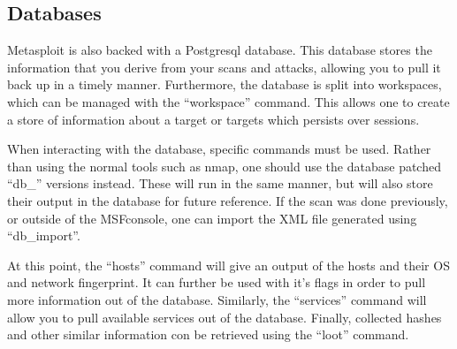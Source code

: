 \documentclass[a4paper,11pt]{report}
\begin{document}
			\subsection{Databases}
				Metasploit is also backed with a Postgresql database. 
				This database stores the information that you derive from your scans and attacks, allowing you to pull it back up in a timely manner. 
				Furthermore, the database is split into workspaces, which can be managed with the ``workspace'' command. 
				This allows one to create a store of information about a target or targets which persists over sessions. 

				When interacting with the database, specific commands must be used. 
				Rather than using the normal tools such as nmap, one should use the database patched ``db\_'' versions instead. 
				These will run in the same manner, but will also store their output in the database for future reference. 
				If the scan was done previously, or outside of the MSFconsole, one can import the XML file generated using ``db\_import''. 

				At this point, the ``hosts'' command will give an output of the hosts and their OS and network fingerprint. 
				It can further be used with it's flags in order to pull more information out of the database. 
				Similarly, the ``services'' command will allow you to pull available services out of the database. 
				Finally, collected hashes and other similar information con be retrieved using the ``loot'' command. 
	
\end{document}
